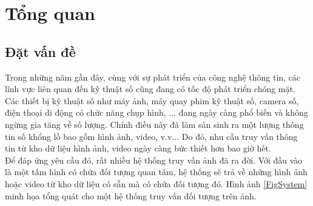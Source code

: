 
\chapter{Tổng quan}
\ifpdf
    \graphicspath{{Chapter1/Chapter1Figs/PNG/}{Chapter1/Chapter1Figs/PDF/}{Chapter1/Chapter1Figs/}}
\else
    \graphicspath{{Chapter1/Chapter1Figs/EPS/}{Chapter1/Chapter1Figs/}}
\fi
{}
\section{Đặt vấn đề}
Trong những năm gần đây, cùng với sự phát triển của công nghệ thông tin, các lĩnh vực liên quan đến kỹ thuật số cũng đang có tốc độ phát triển chóng mặt. Các thiết bị kỹ thuật số như máy ảnh, máy quay phim kỹ thuật số, camera số, điện thoại di động có chức năng chụp hình, ... đang ngày càng phổ biến và không ngừng gia tăng về số lượng. Chính điều này đã làm sản sinh ra một lượng thông tin số khổng lồ bao gồm hình ảnh, video, v.v... Do đó, nhu cầu truy vấn thông tin từ kho dữ liệu hình ảnh, video ngày càng bức thiết hơn bao giờ hết.\\
Để đáp ứng yêu cầu đó, rất nhiều hệ thống truy vấn ảnh đã ra đời. Với đầu vào là một tấm hình có chứa đối tượng quan tâm, hệ thống sẽ trả về những hình ảnh hoặc video từ kho dữ liệu có sẵn mà có chứa đối tượng đó. Hình ảnh \ref{FigSystem} minh họa tổng quát cho một hệ thống truy vấn đối tượng trên ảnh.
